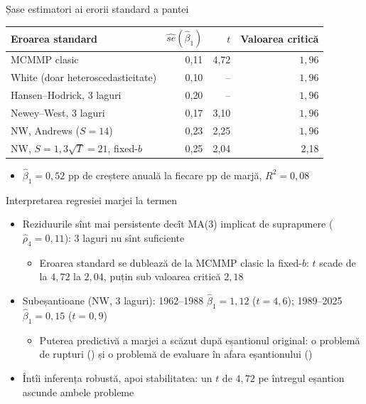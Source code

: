 \begin{frame}{Șase estimatori ai erorii standard a pantei}
\itemsize{\footnotesize}
\begin{center}
\footnotesize
\begin{tabular}{lrrr}
\toprule
Eroarea standard & $\widehat{se}(\hat\beta_1)$ & $t$ & Valoarea critică \\
\midrule
MCMMP clasic & 0{,}11 & 4{,}72 & $1{,}96$ \\
White (doar heteroscedasticitate) & 0{,}10 & -- & $1{,}96$ \\
Hansen--Hodrick, 3 laguri & 0{,}20 & -- & $1{,}96$ \\
Newey--West, 3 laguri & 0{,}17 & 3{,}10 & $1{,}96$ \\
NW, Andrews ($S = 14$) & 0{,}23 & 2{,}25 & $1{,}96$ \\
NW, $S = 1{,}3\sqrt{T} = 21$, fixed-$b$ & 0{,}25 & 2{,}04 & 2{,}18 \\
\bottomrule
\end{tabular}
\end{center}
\begin{itemize}
    \item $\hat\beta_1 = 0{,}52$ pp de creștere anuală la fiecare pp de marjă, $R^2 = 0{,}08$
\end{itemize}
\end{frame}

\begin{frame}{Interpretarea regresiei marjei la termen}
\itemsize{\footnotesize}
\begin{itemize}
    \item Reziduurile sînt mai persistente decît MA(3) implicat de suprapunere ($\hat\rho_4 = 0{,}11$): 3 laguri nu sînt suficiente
    \begin{itemize}
        \item Eroarea standard se dublează de la MCMMP clasic la fixed-$b$: $t$ scade de la $4{,}72$ la $2{,}04$, puțin sub valoarea critică $2{,}18$
    \end{itemize}
    \item Subeșantioane (NW, 3 laguri): 1962--1988 $\hat\beta_1 = 1{,}12$ ($t = 4{,}6$); 1989--2025 $\hat\beta_1 = 0{,}15$ ($t = 0{,}9$)
    \begin{itemize}
        \item Puterea predictivă a marjei a scăzut după eșantionul original: o problemă de rupturi () și o problemă de evaluare în afara eșantionului ()
    \end{itemize}
    \item Întîi inferența robustă, apoi stabilitatea: un $t$ de $4{,}72$ pe întregul eșantion ascunde ambele probleme
\end{itemize}
\end{frame}


